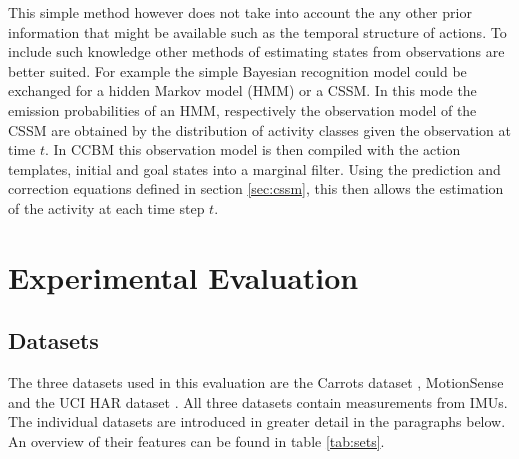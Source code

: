 \documentclass[11pt,titlepage,oneside,openany]{book}
\renewcommand{\algorithmiccomment}[1]{\ensuremath{\rhd} \textit{#1}}
\def\MYCALL#1#2{{\small\textsc{#1}}(\textup{#2})}
\def\MYNOT{\textbf{ not }}
\def\MYBREAK{\textbf{break }}
\def\MYNIL{\textsc{Nil}}
\def\ONT{{\mathcal O}} %
\def\ALI{{\mathcal A}} %
\begin{document}
This simple method however does not take into account the any other prior information that might be available such as the temporal structure of actions. To include such knowledge other methods of estimating states from observations are better suited. For example the simple Bayesian recognition model could be exchanged for a hidden Markov model (HMM) or a CSSM. In this mode the emission probabilities of an HMM, respectively the observation model of the CSSM are obtained by the distribution of activity classes given the observation at time $t$. In CCBM this observation model is then compiled with the action templates, initial and goal states into a marginal filter. Using the prediction and correction equations defined in section \ref{sec:cssm}, this then allows the estimation of the activity at each time step $t$. 



\chapter{Experimental Evaluation}
\label{cha:exp}

\section{Datasets}
\label{sec:data}
The three datasets used in this evaluation are the Carrots dataset \cite{kruger_recognising_2011}, MotionSense \cite{malekzadeh_mobile_2019} and the UCI HAR dataset  \cite{anguita_public_2013}. All three datasets contain measurements from IMUs. The individual datasets are introduced in greater detail in the paragraphs below. An overview of their features can be found in table \ref{tab:sets}.
\end{document}
